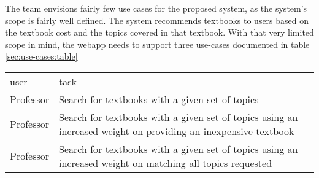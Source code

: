 The team envisions fairly few use cases for the proposed system, as
the system's scope is fairly well defined.
The system recommends textbooks to users based on the textbook cost
and the topics covered in that textbook.
With that very limited scope in mind, the webapp needs to support
three use-cases documented in table \ref{sec:use-cases:table}

\begin{table*}[h]
  \centering
  \caption{Use Cases}
  \begin{tabular}{l l}
    user & task \\
    Professor & Search for textbooks with a given set of topics \\
    Professor & Search for textbooks with a given set of topics using
                an increased weight on providing an inexpensive
                textbook \\
    Professor & Search for textbooks with a given set of topics using
                an increased weight on matching all topics requested 
  \end{tabular} \label{sec:use-cases:table}

\end{table*}

